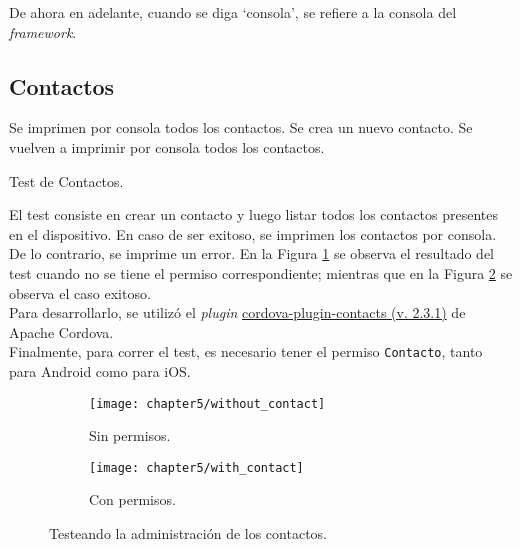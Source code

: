 De ahora en adelante, cuando se diga `consola', se refiere a la consola del \textit{framework}.
\subsection{Contactos}
\begin{algorithm}
	\begin{algorithmic}[1]
		\STATE Se imprimen por consola todos los contactos.
		\STATE Se crea un nuevo contacto.
		\STATE Se vuelven a imprimir por consola todos los contactos.
	\end{algorithmic}
	\caption{Test de Contactos.}\label{alg:chap5:test_contactos}
\end{algorithm}
El test consiste en crear un contacto y luego listar todos los contactos presentes en el dispositivo. En caso de ser exitoso, se imprimen los contactos por consola. De lo contrario, se imprime un error. En la Figura \ref{fig:ch05:without_contact} se observa el resultado del test cuando no se tiene el permiso correspondiente; mientras que en la Figura \ref{fig:ch05:with_contact} se observa el caso exitoso.\\

Para desarrollarlo, se utilizó el \textit{plugin} \href{https://www.npmjs.com/package/cordova-plugin-contacts}{cordova-plugin-contacts (v. 2.3.1)} de Apache Cordova.\\

Finalmente, para correr el test, es necesario tener el permiso \texttt{Contacto}, tanto para Android como para iOS.
\begin{figure}[htbp]
    \centering
    \begin{subfigure}{0.3\linewidth}
        \texttt{[image: chapter5/without\_contact]}
        \caption{Sin permisos.}
        \label{fig:ch05:without_contact}
    \end{subfigure}
    \begin{subfigure}{0.3\linewidth}
        \texttt{[image: chapter5/with\_contact]}
        \caption{Con permisos.}
        \label{fig:ch05:with_contact}
    \end{subfigure}
    \caption{Testeando la administración de los contactos.}
	\label{fig:ch05:contacts-cases}
\end{figure}
